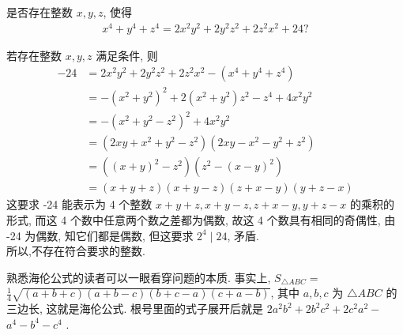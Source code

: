\begin{example}
	是否存在整数 $x ,  y ,  z$, 使得
	\begin{align*}
		x^{4}+y^{4}+z^{4}=2 x^{2} y^{2}+2 y^{2} z^{2}+2 z^{2} x^{2}+24 ?
	\end{align*}
\end{example}
\begin{solution}
	若存在整数 $x ,  y ,  z$ 满足条件, 则
	\begin{align}
		-24 & =2 x^{2} y^{2}+2 y^{2} z^{2}+2 z^{2} x^{2}-\left(x^{4}+y^{4}+z^{4}\right)          \\
		    & =-\left(x^{2}+y^{2}\right)^{2}+2\left(x^{2}+y^{2}\right) z^{2}-z^{4}+4 x^{2} y^{2} \\
		    & =-\left(x^{2}+y^{2}-z^{2}\right)^{2}+4 x^{2} y^{2}                                 \\
		    & =\left(2 x y+x^{2}+y^{2}-z^{2}\right)\left(2 x y-x^{2}-y^{2}+z^{2}\right)          \\
		    & =\left((x+y)^{2}-z^{2}\right)\left(z^{2}-(x-y)^{2}\right)                          \\
		    & =(x+y+z)(x+y-z)(z+x-y)(y+z-x)
	\end{align}
	这要求 -24 能表示为 4 个整数 $x+y+z, x+y-z, z+x-y, y+z-x$ 的乘积的形式, 而这 4 个数中任意两个数之差都为偶数, 故这 4 个数具有相同的奇偶性, 由 -24 为偶数, 知它们都是偶数, 但这要求 $2^{4} \mid 24$, 矛盾.\\
	所以,不存在符合要求的整数.
\end{solution}
\begin{note}
	熟悉海伦公式的读者可以一眼看穿问题的本质. 事实上, $S_{\triangle A B C}=$ $\frac{1}{4} \sqrt{(a+b+c)(a+b-c)(b+c-a)(c+a-b)}$, 其中 $a ,  b ,  c$ 为 $\triangle A B C$ 的三边长, 这就是海伦公式. 根号里面的式子展开后就是 $2 a^{2} b^{2}+2 b^{2} c^{2}+2 c^{2} a^{2}-$ $a^{4}-b^{4}-c^{4}$ .
\end{note}

